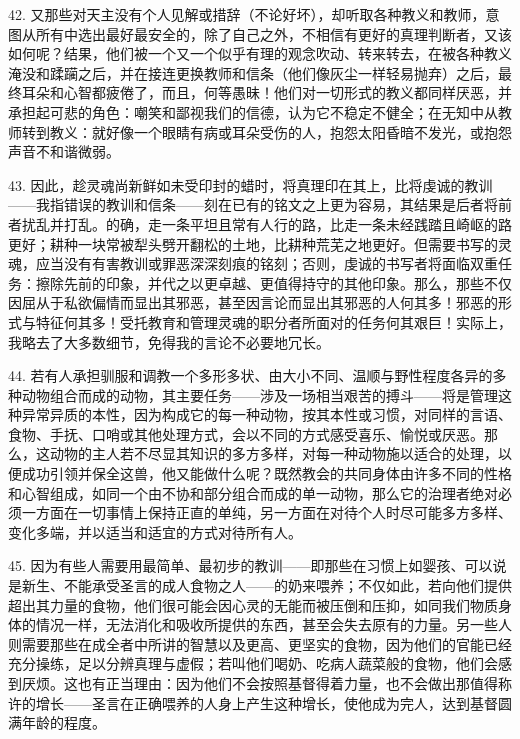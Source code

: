 42. 又那些对天主没有个人见解或措辞（不论好坏），却听取各种教义和教师，意图从所有中选出最好最安全的，除了自己之外，不相信有更好的真理判断者，又该如何呢？结果，他们被一个又一个似乎有理的观念吹动、转来转去，在被各种教义淹没和蹂躏之后，并在接连更换教师和信条（他们像灰尘一样轻易抛弃）之后，最终耳朵和心智都疲倦了，而且，何等愚昧！他们对一切形式的教义都同样厌恶，并承担起可悲的角色：嘲笑和鄙视我们的信德，认为它不稳定不健全；在无知中从教师转到教义：就好像一个眼睛有病或耳朵受伤的人，抱怨太阳昏暗不发光，或抱怨声音不和谐微弱。\par

43. 因此，趁灵魂尚新鲜如未受印封的蜡时，将真理印在其上，比将虔诚的教训——我指错误的教训和信条——刻在已有的铭文之上更为容易，其结果是后者将前者扰乱并打乱。的确，走一条平坦且常有人行的路，比走一条未经践踏且崎岖的路更好；耕种一块常被犁头劈开翻松的土地，比耕种荒芜之地更好。但需要书写的灵魂，应当没有有害教训或罪恶深深刻痕的铭刻；否则，虔诚的书写者将面临双重任务：擦除先前的印象，并代之以更卓越、更值得持守的其他印象。那么，那些不仅因屈从于私欲偏情而显出其邪恶，甚至因言论而显出其邪恶的人何其多！邪恶的形式与特征何其多！受托教育和管理灵魂的职分者所面对的任务何其艰巨！实际上，我略去了大多数细节，免得我的言论不必要地冗长。\par

44. 若有人承担驯服和调教一个多形多状、由大小不同、温顺与野性程度各异的多种动物组合而成的动物，其主要任务——涉及一场相当艰苦的搏斗——将是管理这种异常异质的本性，因为构成它的每一种动物，按其本性或习惯，对同样的言语、食物、手抚、口哨或其他处理方式，会以不同的方式感受喜乐、愉悦或厌恶。那么，这动物的主人若不尽显其知识的多方多样，对每一种动物施以适合的处理，以便成功引领并保全这兽，他又能做什么呢？既然教会的共同身体由许多不同的性格和心智组成，如同一个由不协和部分组合而成的单一动物，那么它的治理者绝对必须一方面在一切事情上保持正直的单纯，另一方面在对待个人时尽可能多方多样、变化多端，并以适当和适宜的方式对待所有人。\par

45. 因为有些人需要用最简单、最初步的教训——即那些在习惯上如婴孩、可以说是新生、不能承受圣言的成人食物之人——的奶来喂养；不仅如此，若向他们提供超出其力量的食物，他们很可能会因心灵的无能而被压倒和压抑，如同我们物质身体的情况一样，无法消化和吸收所提供的东西，甚至会失去原有的力量。另一些人则需要那些在成全者中所讲的智慧以及更高、更坚实的食物，因为他们的官能已经充分操练，足以分辨真理与虚假；若叫他们喝奶、吃病人蔬菜般的食物，他们会感到厌烦。这也有正当理由：因为他们不会按照基督得着力量，也不会做出那值得称许的增长——圣言在正确喂养的人身上产生这种增长，使他成为完人，达到基督圆满年龄的程度。\par

